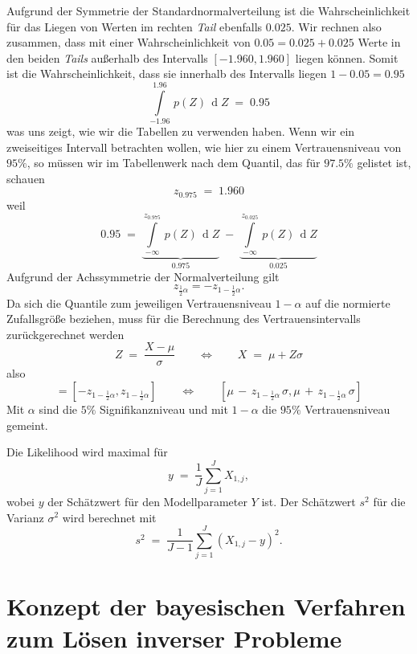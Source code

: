 Aufgrund der Symmetrie der Standardnormalverteilung ist die Wahrscheinlichkeit für das Liegen von
Werten im rechten \textsl{Tail} ebenfalls $0.025$. Wir rechnen also zusammen, dass mit
einer Wahrscheinlichkeit von $0.05 = 0.025+0.025$ Werte in den beiden \textsl{Tails} außerhalb
des Intervalls $[-1.960, 1.960]$ liegen können. Somit ist die Wahrscheinlichkeit, dass sie
innerhalb des Intervalls liegen $1 - 0.05 = 0.95$
\begin{equation}
\int\limits_{-1.96}^{1.96} \, p(Z) \, \operatorname{d} Z \; = \; 0.95
\end{equation}
was uns zeigt, wie wir die Tabellen zu verwenden haben.
Wenn wir ein zweiseitiges Intervall betrachten wollen, wie hier zu einem Vertrauensniveau
von $95 \%$, so müssen wir im Tabellenwerk nach dem Quantil, das für $97.5 \%$ gelistet
ist, schauen
$$
z_{0.975} \; = \; 1.960
$$
weil
$$
0.95 \; = \;
\underbrace{\int\limits_{-\infty}^{z_{0.975}} \, p(Z) \, \operatorname{d} Z}_{0.975} \; - \;
\underbrace{\int\limits_{-\infty}^{z_{0.025}} \, p(Z) \, \operatorname{d} Z}_{0.025}
$$
Aufgrund der Achssymmetrie der Normalverteilung gilt
$$
z_{\frac{1}{2}\alpha} = -z_{1-\frac{1}{2}\alpha} .
$$
Da sich die Quantile zum jeweiligen Vertrauensniveau $1-\alpha$ auf die normierte Zufallsgröße
beziehen, muss für die Berechnung des Vertrauensintervalls zurückgerechnet werden
\begin{equation}
Z \; = \; \frac{X - \mu}{\sigma} \qquad \Leftrightarrow \qquad X \; = \; \mu + Z \sigma
\end{equation}
also
\begin{equation}
[z_{\frac{1}{2}\alpha}, z_{1-\frac{1}{2}\alpha}] =
[-z_{1-\frac{1}{2}\alpha}, z_{1-\frac{1}{2}\alpha}]
 \qquad \Leftrightarrow  \qquad
[\mu \, - \, z_{1-\frac{1}{2}\alpha} \, \sigma, \mu \, + \, z_{1-\frac{1}{2}\alpha} \, \sigma]
\end{equation}
Mit $\alpha$ sind die $5 \%$ Signifikanzniveau und mit $1-\alpha$ die $95 \%$ Vertrauensniveau gemeint.

Die Likelihood wird maximal für
\begin{equation}
y \; = \; \frac{1}{J} \sum_{j=1}^J X_{1,j} ,
\end{equation}
wobei $y$ der Schätzwert für den Modellparameter $Y$ ist.
Der Schätzwert $s^2$ für die Varianz $\sigma^2$ wird berechnet mit
\begin{equation}
s^2 \; = \; \frac{1}{J-1} \sum_{j=1}^J (X_{1,j} - y)^2 .
\end{equation}

\section{Konzept der bayesischen Verfahren zum Lösen inverser Probleme}
\label{bayeskonzept}

